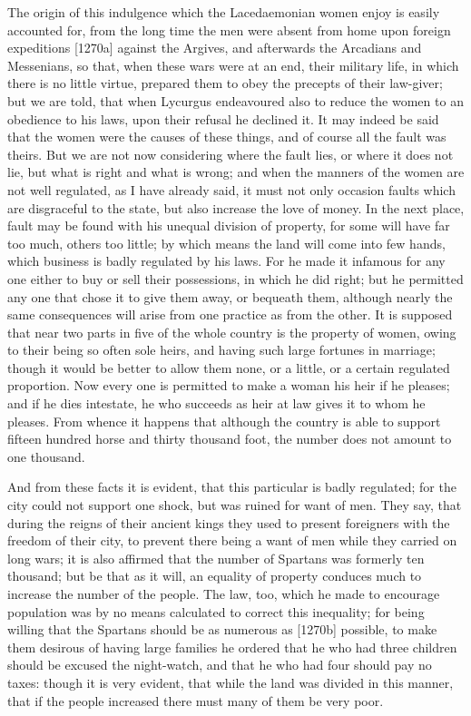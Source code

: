 The origin of this indulgence which the Lacedaemonian women enjoy is
easily accounted for, from the long time the men were absent from home
upon foreign expeditions [1270a] against the Argives, and afterwards the
Arcadians and Messenians, so that, when these wars were at an end, their
military life, in which there is no little virtue, prepared them to obey
the precepts of their law-giver; but we are told, that when Lycurgus
endeavoured also to reduce the women to an obedience to his laws, upon
their refusal he declined it. It may indeed be said that the women were
the causes of these things, and of course all the fault was theirs. But we
are not now considering where the fault lies, or where it does not lie,
but what is right and what is wrong; and when the manners of the women are
not well regulated, as I have already said, it must not only occasion
faults which are disgraceful to the state, but also increase the love of
money. In the next place, fault may be found with his unequal division of
property, for some will have far too much, others too little; by which
means the land will come into few hands, which business is badly regulated
by his laws. For he made it infamous for any one either to buy or sell
their possessions, in which he did right; but he permitted any one that
chose it to give them away, or bequeath them, although nearly the same
consequences will arise from one practice as from the other. It is
supposed that near two parts in five of the whole country is the property
of women, owing to their being so often sole heirs, and having such large
fortunes in marriage; though it would be better to allow them none, or a
little, or a certain regulated proportion. Now every one is permitted to
make a woman his heir if he pleases; and if he dies intestate, he who
succeeds as heir at law gives it to whom he pleases. From whence it
happens that although the country is able to support fifteen hundred horse
and thirty thousand foot, the number does not amount to one thousand.

And from these facts it is evident, that this particular is badly
regulated; for the city could not support one shock, but was ruined for
want of men. They say, that during the reigns of their ancient kings they
used to present foreigners with the freedom of their city, to prevent
there being a want of men while they carried on long wars; it is also
affirmed that the number of Spartans was formerly ten thousand; but be
that as it will, an equality of property conduces much to increase the
number of the people. The law, too, which he made to encourage population
was by no means calculated to correct this inequality; for being willing
that the Spartans should be as numerous as [1270b] possible, to make them
desirous of having large families he ordered that he who had three
children should be excused the night-watch, and that he who had four
should pay no taxes: though it is very evident, that while the land was
divided in this manner, that if the people increased there must many of
them be very poor.


